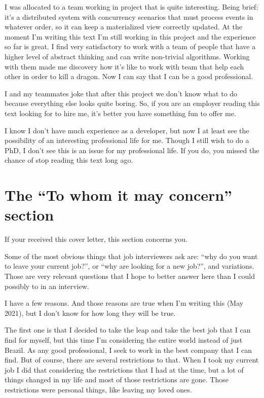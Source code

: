 \documentclass[11pt,a4paper,sans]{moderncv}
\begin{document}
\medskip

I was allocated to a team working in project that is quite interesting.
Being brief: it's a distributed system with concurrency scenarios that must process events in whatever order, so it can keep a materialized view correctly updated.
At the moment I'm writing this text I'm still working in this project and the experience so far is great.
I find very satisfactory to work with a team of people that have a higher level of abstract thinking and can write non-trivial algorithms.
Working with them made me discovery how it's like to work with team that help each other in order to kill a dragon.
Now I can say that I can be a good professional.

\medskip

I and my teammates joke that after this project we don't know what to do because everything else looks quite boring.
So, if you are an employer reading this text looking for to hire me, it's better you have something fun to offer me.

\medskip

I know I don't have much experience as a developer, but now I at least see the possibility of an interesting professional life for me.
Though I still wish to do a PhD, I don't see this is an issue for my professional life.
If you do, you missed the chance of stop reading this text long ago.

\section{The ``To whom it may concern'' section}
If your received this cover letter, this section concerns you.

\medskip

Some of the most obvious things that job interviewers ask are:
``why do you want to leave your current job?'', or
``why are looking for a new job?'', and variations.
Those are very relevant questions that I hope to better answer here than I could possibly to in an interview.

\medskip

I have a few reasons. And those reasons are true when I'm writing this (May 2021), but I don't know for how long they will be true.

\medskip

The first one is that I decided to take the leap and take the best job that I can find for myself, but this time I'm considering the entire world instead of just Brazil.
As any good professional, I seek to work in the best company that I can find.
But of course, there are several restrictions to that.
When I took my current job I did that considering the restrictions that I had at the time, but a lot of things changed in my life and most of those restrictions are gone.
Those restrictions were personal things, like leaving my loved ones.
\end{document}
